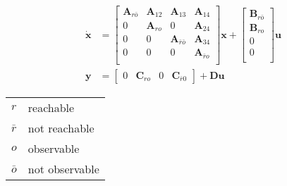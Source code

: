 \begin{align*}
    \dot{\mathbf{x}} & = \begin{bmatrix}
                             \mathbf{A}_{r\bar{o}} & \mathbf{A}_{12} & \mathbf{A}_{13}             & \mathbf{A}_{14}       \\
                             0                     & \mathbf{A}_{ro} & 0                           & \mathbf{A}_{24}       \\
                             0                     & 0               & \mathbf{A}_{\bar{r}\bar{o}} & \mathbf{A}_{34}       \\
                             0                     & 0               & 0                           & \mathbf{A}_{\bar{r}o} \\
                         \end{bmatrix}
    \mathbf{x} + \begin{bmatrix}
                     \mathbf{B}_{r\bar{o}} \\
                     \mathbf{B}_{ro}       \\
                     0                     \\
                     0                     \\
                 \end{bmatrix}
    \mathbf{u}                                                                                                         \\
    \mathbf{y}       & = \begin{bmatrix}
                             0 & \mathbf{C}_{ro} & 0 & \mathbf{C}_{\bar{r}0}
                         \end{bmatrix}
    + \mathbf{Du}
\end{align*}

\newpar{}

\begin{tabularx}{\linewidth}{@{}ll@{}}
    $r$       & reachable      \\
    $\bar{r}$ & not reachable  \\
    $o$       & observable     \\
    $\bar{o}$ & not observable \\
\end{tabularx}

